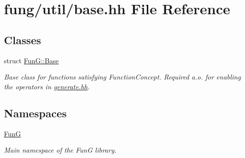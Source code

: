 \hypertarget{base_8hh}{}\section{fung/util/base.hh File Reference}
\label{base_8hh}
\subsection*{Classes}
\begin{DoxyCompactItemize}
\item 
struct \hyperlink{structFunG_1_1Base}{Fun\+G\+::\+Base}
\begin{DoxyCompactList}\small\item\em Base class for functions satisfying Function\+Concept. Required a.\+o. for enabling the operators in \hyperlink{generate_8hh}{generate.\+hh}. \end{DoxyCompactList}\end{DoxyCompactItemize}
\subsection*{Namespaces}
\begin{DoxyCompactItemize}
\item 
 \hyperlink{namespaceFunG}{Fun\+G}
\begin{DoxyCompactList}\small\item\em Main namespace of the Fun\+G library. \end{DoxyCompactList}\end{DoxyCompactItemize}
